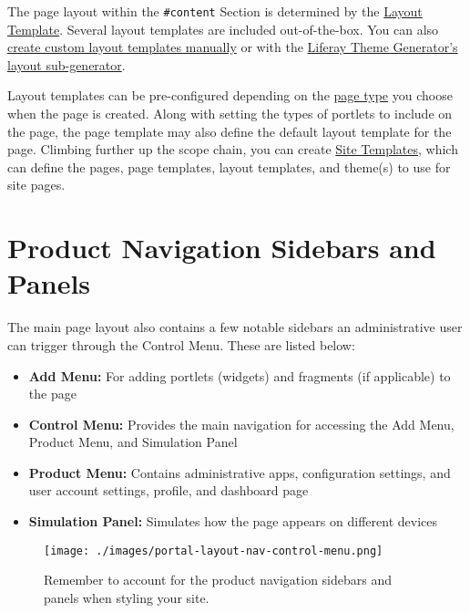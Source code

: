 The page layout within the \texttt{\#content} Section is determined by
the
\href{/docs/7-2/frameworks/-/knowledge_base/f/layout-templates-intro}{Layout
Template}. Several layout templates are included out-of-the-box. You can
also
\href{/docs/7-2/frameworks/-/knowledge_base/f/layout-templates-intro}{create
custom layout templates manually} or with the
\href{/docs/7-2/reference/-/knowledge_base/r/creating-layout-templates-with-the-themes-generator}{Liferay
Theme Generator's layout sub-generator}.

Layout templates can be pre-configured depending on the
\href{/docs/7-2/user/-/knowledge_base/u/creating-pages}{page type} you
choose when the page is created. Along with setting the types of
portlets to include on the page, the page template may also define the
default layout template for the page. Climbing further up the scope
chain, you can create
\href{/docs/7-2/user/-/knowledge_base/u/building-sites-from-templates}{Site
Templates}, which can define the pages, page templates, layout
templates, and theme(s) to use for site pages.

\section{Product Navigation Sidebars and
Panels}\label{product-navigation-sidebars-and-panels-1}

The main page layout also contains a few notable sidebars an
administrative user can trigger through the Control Menu. These are
listed below:

\begin{itemize}
\tightlist
\item
  \textbf{Add Menu:} For adding portlets (widgets) and fragments (if
  applicable) to the page
\item
  \textbf{Control Menu:} Provides the main navigation for accessing the
  Add Menu, Product Menu, and Simulation Panel
\item
  \textbf{Product Menu:} Contains administrative apps, configuration
  settings, and user account settings, profile, and dashboard page
\item
  \textbf{Simulation Panel:} Simulates how the page appears on different
  devices
\end{itemize}

\begin{figure}
\centering
\texttt{[image: ./images/portal-layout-nav-control-menu.png]}
\caption{Remember to account for the product navigation sidebars and
panels when styling your site.}
\end{figure}

